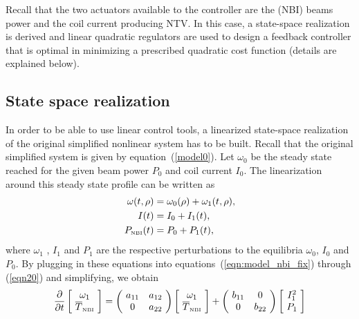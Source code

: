 \documentclass[12pt]{iopart}
\begin{document}
 Recall that the two actuators available to the controller are the (NBI) beams power and the coil current producing NTV.
In this case, a state-space realization is derived and linear quadratic regulators are used to design a feedback controller that is optimal in minimizing a prescribed quadratic cost function (details are explained below).

\subsection{State space realization}
In order to be able to use linear control tools, a linearized state-space realization of the original simplified nonlinear system has to be built.
Recall that the original simplified system is given by equation~(\ref{model0}).
Let $\omega_0$ be the steady state reached for the given beam power $ P_0$ and coil current $I_0$. The linearization around this steady state profile can be written as
\begin{eqnarray}
\omega (t, \rho) &= \omega_0 (\rho) + \omega_1(t, \rho), \\
I (t) &= I_0 + I_1(t),\\
P_\textrm{\tiny NBI} (t) &= P_0 + P_1(t),
\end{eqnarray}
where $ \omega_1$ , $ I_1$ and $P_1$ are the respective perturbations to the equilibria $\omega_0$, $I_0$ and $P_0$.
By plugging in these equations into equations~(\ref{eqn:model_nbi_fix}) through (\ref{eqn20}) and simplifying, we obtain
\begin{equation}
\frac{\partial}{\partial t}   \left[\! \begin{array}{c}  \omega_1 \\ \overline{T}_\textrm{\tiny{NBI}} \end{array}\!\right]
  ={ \left(\! \begin{array}{cc} a_{11}  & a_{12} \\ 0 & a_{22} \end{array} \! \right)} \left[\! \begin{array}{c} \omega_1 \\ \overline{T}_\textrm{\tiny{NBI}}    \end{array}  \!\right] + \left(\! \begin{array}{cc} b_{11}  & 0 \\ 0 & b_{22}    \end{array}  \!\right) \left[\! \begin{array}{c}  I^2_1 \\ P_1\end{array}\!\right]
\label{SSR}
\end{equation}
\end{document}
